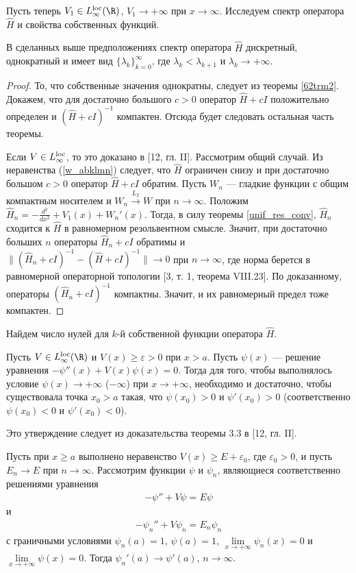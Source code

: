 \documentclass[a4paper
]{article}
\begin{document}
Пусть теперь $V_1\in L_\infty^{{\rm loc}}(\R)$, $V_1
\rightarrow +\infty$ при $x\rightarrow \infty$. Исследуем спектр
оператора $\hat H$ и свойства собственных функций.
\begin{Trm}
В сделанных выше предположениях спектр оператора $\hat H$ дискретный,
однократный и имеет вид $\{\lambda_k\}_{k=0}^\infty$, где $\lambda_k
<\lambda_{k+1}$ и $\lambda_k\rightarrow +\infty$.
\end{Trm}
\begin{proof}
То, что собственные значения однократны, следует из теоремы \ref{62trm2}.
Докажем, что для достаточно большого $c>0$ оператор $\hat H+cI$ положительно
определен и $(\hat H+cI)^{-1}$ компактен. Отсюда будет следовать остальная
часть теоремы. \par
Если $V\in L_\infty^{{\rm loc}}$, то это доказано в [12, гл. II].
Рассмотрим общий случай. Из неравенства (\ref{w_abklmn}) следует, что
$\hat H$ ограничен снизу и при достаточно большом $c>0$ оператор $\hat H+
cI$ обратим. Пусть $W_n$ --- гладкие функции с общим компактным
носителем и $W_n\stackrel{L_2}{\rightarrow}W$ при $n\rightarrow \infty$.
Положим $\hat H_n=-\frac{d^2}{dx^2}+V_1(x)+W_n'(x)$. Тогда, в силу теоремы
\ref{unif_res_conv}, $\hat H_n$ сходится к $\hat H$ в равномерном
резольвентном смысле. Значит, при достаточно больших $n$ операторы
$\hat H_n+cI$ обратимы и $\|(\hat H_n+cI)^{-1}-(\hat H+cI)^{-1}
\|\rightarrow 0$ при $n\rightarrow \infty$, где норма берется в равномерной
операторной топологии [3, т. 1, теорема VIII.23]. По доказанному,
операторы $(\hat H_n+cI)^{-1}$ компактны. Значит, и их равномерный
предел тоже компактен.
\end{proof}
Найдем число нулей для $k$-й собственной функции оператора $\hat H$.
\begin{Lem}
\label{krit_infty_0}
Пусть $V\in L_\infty^{{\rm loc}}(\R)$ и $V(x)\ge \varepsilon>0$ при $x>a$.
Пусть $\psi(x)$ --- решение уравнения $-\psi''(x)+V(x)\psi(x)=0$.
Тогда для того, чтобы выполнялось условие $\psi(x)\rightarrow +\infty$
($-\infty$) при $x\rightarrow +\infty$, необходимо и достаточно,
чтобы существовала точка $x_0>a$ такая, что $\psi(x_0)>0$ и
$\psi'(x_0)>0$ (соответственно $\psi(x_0)<0$ и $\psi'(x_0)<0$).
\end{Lem}
Это утверждение следует из доказательства теоремы 3.3 в [12, гл. II].
\begin{Lem}
\label{faf1a}
Пусть при $x\ge a$ выполнено неравенство $V(x)\ge E+\varepsilon_0$,
где $\varepsilon_0>0$, и пусть $E_n\rightarrow E$ при $n\rightarrow \infty$.
Рассмотрим функции $\psi$ и $\psi _n$, являющиеся соответственно
решениями уравнения
\begin{align}
\label{st_liouv_0n}
-\psi ''+V\psi =E\psi
\end{align}
и
\begin{align}
\label{st_liouv_0n1}
-\psi _n''+V\psi _n=E_n\psi _n
\end{align}
с граничными условиями $\psi _n(a)=1$, $\psi(a)=1$, $\lim \limits
_{x\rightarrow +\infty}\psi _n(x)=0$
и $\lim \limits _{x\rightarrow +\infty}\psi(x)=0$.
Тогда $\psi _n'(a)\rightarrow \psi '(a)$, $n\rightarrow \infty$.
\end{Lem}
\end{document}
